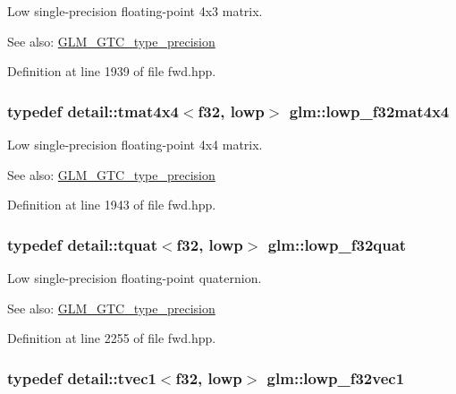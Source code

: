 Low single-precision floating-point 4x3 matrix. \begin{Desc}
\item[See also:]\hyperlink{group__gtc__type__precision}{GLM\_\-GTC\_\-type\_\-precision} \end{Desc}


Definition at line 1939 of file fwd.hpp.\hypertarget{group__gtc__type__precision_gb7a6454e1f5d5c434ff316b139eb0231}{
\subsubsection[lowp\_\-f32mat4x4]{\setlength{\rightskip}{0pt plus 5cm}typedef detail::tmat4x4$<$f32, lowp$>$ {\bf glm::lowp\_\-f32mat4x4}}}
\label{group__gtc__type__precision_gb7a6454e1f5d5c434ff316b139eb0231}


Low single-precision floating-point 4x4 matrix. \begin{Desc}
\item[See also:]\hyperlink{group__gtc__type__precision}{GLM\_\-GTC\_\-type\_\-precision} \end{Desc}


Definition at line 1943 of file fwd.hpp.\hypertarget{group__gtc__type__precision_g83edc5f21bfa41f72f881b29aabbd919}{
\subsubsection[lowp\_\-f32quat]{\setlength{\rightskip}{0pt plus 5cm}typedef detail::tquat$<$f32, lowp$>$ {\bf glm::lowp\_\-f32quat}}}
\label{group__gtc__type__precision_g83edc5f21bfa41f72f881b29aabbd919}


Low single-precision floating-point quaternion. \begin{Desc}
\item[See also:]\hyperlink{group__gtc__type__precision}{GLM\_\-GTC\_\-type\_\-precision} \end{Desc}


Definition at line 2255 of file fwd.hpp.\hypertarget{group__gtc__type__precision_ge802918ade0497b72c606430830f5ebb}{
\subsubsection[lowp\_\-f32vec1]{\setlength{\rightskip}{0pt plus 5cm}typedef detail::tvec1$<$f32, lowp$>$ {\bf glm::lowp\_\-f32vec1}}}
\label{group__gtc__type__precision_ge802918ade0497b72c606430830f5ebb}



